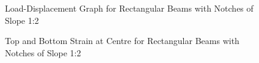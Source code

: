 \documentclass[11pt,a4paper]{article}
\numberwithin{equation}{subsection}
\begin{document}
\begin{figure}[h]
	\begin{center}
	\end{center}
	\caption{Load-Displacement Graph for Rectangular Beams with Notches of Slope 1:2}
	\label{fig:Rect_12_def}
\end{figure}


\begin{figure}[h]
	\begin{center}
	\end{center}
	\caption{Top and Bottom Strain at Centre for Rectangular Beams with Notches of Slope 1:2}
	\label{fig:Rect_12_centre}
\end{figure}
\end{document}
